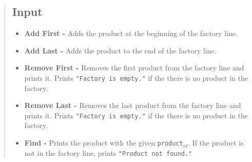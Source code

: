 \documentclass[12pt]{article}
\begin{document}
\begin{quote}
\subsection{Input}




\begin{itemize}
    \item \textbf{Add First - } Adds the product at the beginning of the factory line. \hfill \\ [10pt]
    \vspace{7pt}
    
    \item \textbf{Add Last - } Adds the product to the end of the factory line. \hfill \\ [10pt]
    \vspace{7pt}

    \item \textbf{Remove First - } Removes the first product from the factory line and prints it. Prints \verb|"Factory is empty."| if the there is no product in the factory. \hfill \\ [10pt]
    \vspace{7pt}
    
    \item \textbf{Remove Last - } Removes the last product from the factory line and prints it. Prints \verb|"Factory is empty."| if the there is no product in the factory. \hfill \\ [10pt]
    \vspace{7pt}
    
    \item \textbf{Find - } Prints the product with the given \texttt{product$_{id}$}. If the product is not in the factory line, prints \verb|"Product not found."|\hfill \\ [10pt]
    \vspace{7pt}
    

\end{itemize}
\end{quote}
\end{document}
